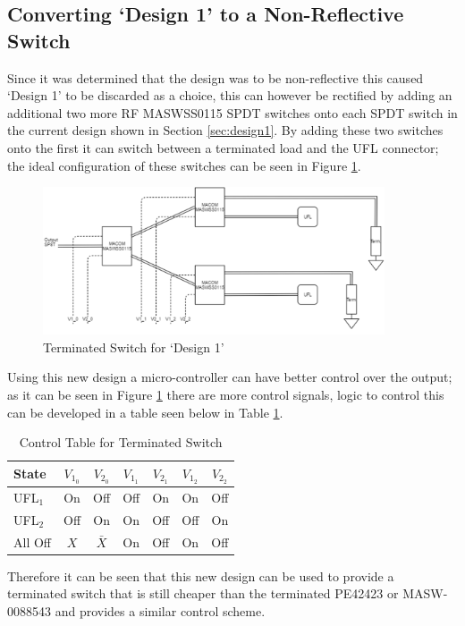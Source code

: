 \documentclass[12pt,openany,a4paper]{book}
\begin{document}
\subsection{Converting `Design 1' to a Non-Reflective Switch} \label{sec:design1-correction}
Since it was determined that the design was to be non-reflective this caused `Design 1' to be discarded as a choice, this can however be rectified by adding an additional two more RF MASWSS0115 SPDT switches onto each SPDT switch in the current design shown in Section \ref{sec:design1}. By adding these two switches onto the first it can switch between a terminated load and the UFL connector; the ideal configuration of these switches can be seen in Figure \ref{fig:corrected-design1}.
\begin{figure}[H]
	\centering
    \includegraphics[width=0.9\textwidth]{design1-rectify.png}
	\caption{Terminated Switch for `Design 1'}
	\label{fig:corrected-design1}
\end{figure}
Using this new design a micro-controller can have better control over the output; as it can be seen in Figure \ref{fig:corrected-design1} there are more control signals, logic to control this can be developed in a table seen below in Table \ref{tab:control-correcteddesign1}.
\begin{table}[H]
	\centering
	\begin{tabular}{l c c c c c c}
		\hline
		State & $V_{1_0}$ & $V_{2_0}$ & $V_{1_1}$ & $V_{2_1}$ & $V_{1_2}$ & $V_{2_2}$\\
		\hline
		UFL$_1$ & On & Off & Off & On & On & Off \\
		UFL$_2$ & Off & On & On & Off & Off & On \\
		All Off & $X$ & $\bar{X}$ & On & Off & On & Off\\
		\hline
	\end{tabular}
	\caption{Control Table for Terminated Switch}
	\label{tab:control-correcteddesign1}
\end{table}
Therefore it can be seen that this new design can be used to provide a terminated switch that is still cheaper than the terminated PE42423 or MASW-0088543 and provides a similar control scheme. 
\end{document}
